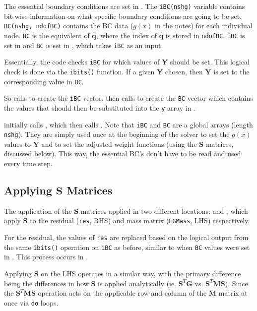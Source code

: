 \documentclass[12pt, letterpaper, twoside]{article}
\renewcommand{\vec}[1]{\bm{#1}}
\newcommand{\ttt}[1]{\texttt{#1}}
\newcommand{\Y}{\vec{Y}}
\newcommand{\G}{\vec{G}}
\newcommand{\M}{\vec{M}}
\newcommand{\Sm}{\vec{S}}
\newcommand{\0}{\vec{0}}
\begin{document}
The essential boundary conditions are set in . The \ttt{iBC(nshg)} variable contains bit-wise information on what specific boundary conditions are going to be set. \ttt{BC(nshg, ndofBC)} contains the BC data (\(g(x)\) in the notes) for each individual node. \ttt{BC} is the equivalent of \(\hat{\vec{q}}\), where the index of \(\hat{\vec{q}}\) is stored in \ttt{ndofBC}. 
\ttt{iBC} is set in  and \ttt{BC} is set in , which takes \ttt{iBC} as an input. 

Essentially, the code checks \ttt{iBC} for which values of \(\Y\) should be set. This logical check is done via the \ttt{ibits()} function. If a given \(\Y\) chosen, then \(\Y\) is set to the corresponding value in \ttt{BC}.

So  calls  to create the \ttt{iBC} vector.  then calls  to create the \ttt{BC} vector which contains the values that should then be substituted into the \ttt{y} array in .

 initially calls , which then calls . Note that \ttt{iBC} and \ttt{BC} are a global arrays (length \ttt{nshg}). They are simply used once at the beginning of the solver to set the \(g(x)\) values to \(\Y\) and to set the adjusted weight functions (using the \(\Sm\) matrices, discussed below). This way, the essential BC's don't have to be read and used every time step.


\subsection{Applying \(\vec{S}\) Matrices}
The application of the \(\Sm\) matrices applied in two different locations:  and , which apply \(\Sm\) to the residual (\ttt{res}, RHS) and mass matrix (\ttt{EGMass}, LHS) respectively. 

For the residual, the values of \ttt{res} are replaced based on the logical output from the same \ttt{ibits()} operation on \ttt{iBC} as before, similar to when \ttt{BC} values were set in . This process occurs in . 

Applying \(\Sm\) on the LHS operates in a similar way, with the primary difference being the differences in how \(\Sm\) is applied analytically (ie. \(\Sm^T \G\) vs. \(\Sm^T \M \Sm\)). Since the \(\Sm^T \M \Sm\) operation acts on the applicable row and column of the \(\M\) matrix at once via \ttt{do} loops.
\end{document}
